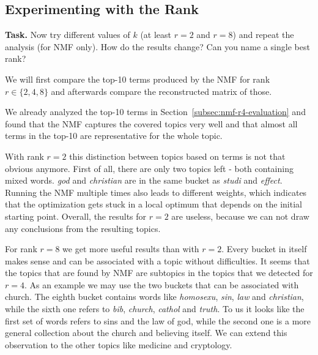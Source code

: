 \documentclass{support/acm_proc_article-sp}
\begin{document}

    \subsection{Experimenting with the Rank}

    \textbf{Task.} Now try different values of $k$ (at least $r = 2$ and $r = 8$) and repeat the analysis (for NMF only).
    How do the results change?
    Can you name a single best rank?

    We will first compare the top-10 terms produced by the NMF for rank $r \in \{2, 4, 8\}$ and afterwards compare the
    reconstructed matrix of those.

    We already analyzed the top-10 terms in Section~\ref{subsec:nmf-r4-evaluation} and found that the NMF captures
    the covered topics very well and that almost all terms in the top-10 are representative for the whole topic.

    With rank $r = 2$ this distinction between topics based on terms is not that obvious anymore.
    First of all, there are only two topics left - both containing mixed words.
    \emph{god} and \emph{christian} are in the same bucket as \emph{studi} and \emph{effect}.
    Running the NMF multiple times also leads to different weights, which indicates that the optimization gets stuck
    in a local optimum that depends on the initial starting point.
    Overall, the results for $r = 2$ are useless, because we can not draw any conclusions from the resulting topics.

    For rank $r = 8$ we get more useful results than with $r = 2$.
    Every bucket in itself makes sense and can be associated with a topic without difficulties.
    It seems that the topics that are found by NMF are subtopics in the topics that we detected for $r = 4$.
    As an example we may use the two buckets that can be associated with church.
    The eighth bucket contains words like \emph{homosexu}, \emph{sin}, \emph{law} and \emph{christian},
    while the sixth one refers to \emph{bib}, \emph{church}, \emph{cathol} and \emph{truth}.
    To us it looks like the first set of words refers to sins and the law of god, while the second one is a more general
    collection about the church and believing itself.
    We can extend this observation to the other topics like medicine and cryptology.
\end{document}
